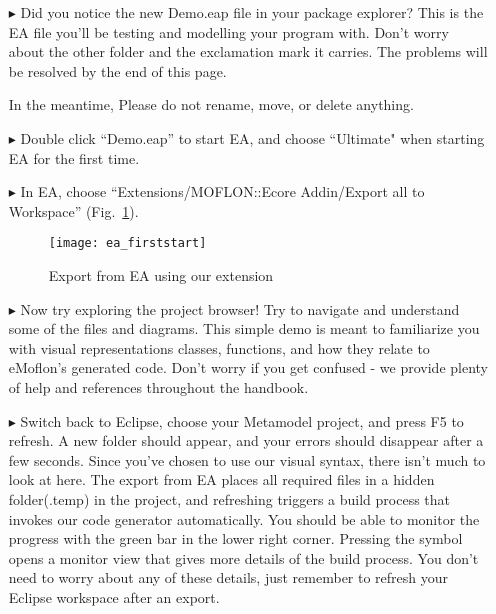 \newpage
\visHeader
{}

\begin{itemize}
\FloatBarrier
\item[$\blacktriangleright$] Did\hypertarget{simpleDemo vis}{} you notice the new Demo.eap file in your package explorer? This is the EA file you'll be testing and modelling your program with. Don't worry about the other folder and the exclamation mark it carries. The problems will be resolved by the end of this page.

In the meantime, Please do not rename, move, or delete anything.

\item[$\blacktriangleright$] Double click ``Demo.eap'' to start EA, and choose ``Ultimate" when starting EA for the first time.

\item[$\blacktriangleright$] In EA, choose ``Extensions/MOFLON::Ecore Addin/Export\- all\- to\- Workspace'' (Fig.~\ref{fig_ea}).

\vspace{1cm}

\begin{figure}[htbp]
	\centering
  \texttt{[image: ea\_firststart]}
	\caption{Export from EA using our extension} 
	\label{fig_ea} 
\end{figure}

\vspace{1cm}

\item[$\blacktriangleright$] Now try exploring the project browser! Try to navigate and understand some of the files and diagrams. This simple demo is meant to familiarize you with visual representations classes, functions, and how they relate to eMoflon's generated code. Don't worry if you get confused - we provide plenty of help and references throughout the handbook.
  
\item[$\blacktriangleright$] Switch back to Eclipse, choose your Metamodel project, and press F5 to refresh. A new folder should appear, and your errors should disappear after a few seconds. Since you've chosen to use our visual syntax, there isn't much to look at here. The export from EA places all required files in a hidden folder(.temp) in the project, and refreshing triggers a build process that invokes our code generator automatically. 
You should be able to monitor the progress with the green bar in the lower right corner. Pressing the symbol opens a monitor view that gives more details of the build process. You don't need to worry about any of these details, just remember to refresh your Eclipse workspace after an export.

\end{itemize}